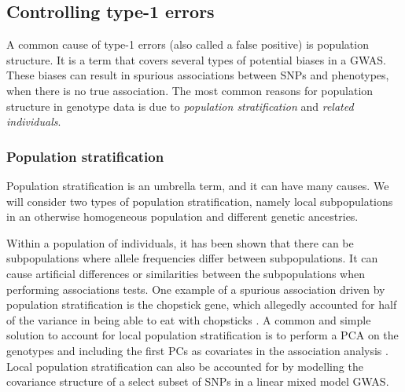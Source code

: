 \subsection{Controlling type-1 errors} \label{sec:controllingType1Errors}
A common cause of type-1 errors (also called a false positive) is population structure. It is a term that covers several types of potential biases in a GWAS. These biases can result in spurious associations between SNPs and phenotypes, when there is no true association. The most common reasons for population structure in genotype data is due to \textit{population stratification} and \textit{related individuals}. %

\subsubsection{Population stratification}
Population stratification is an umbrella term, and it can have many causes. We will consider two types of population stratification, namely local subpopulations in an otherwise homogeneous population and different genetic ancestries. 

Within a population of individuals, it has been shown that there can be subpopulations where allele frequencies differ between subpopulations\cite{abdellaoui2013association,genome2014whole}. It can cause artificial differences or similarities between the subpopulations when performing associations tests. One example of a spurious association driven by population stratification is the chopstick gene, which allegedly accounted for half of the variance in being able to eat with chopsticks \cite{marees2018tutorial,hamer2000beware}. A common and simple solution to account for local population stratification is to perform a PCA on the genotypes and including the first PCs as covariates in the association analysis \cite{price2006principal,price2010new,prive2020efficient}. Local population stratification can also be accounted for by modelling the covariance structure of a select subset of SNPs in a linear mixed model GWAS.

